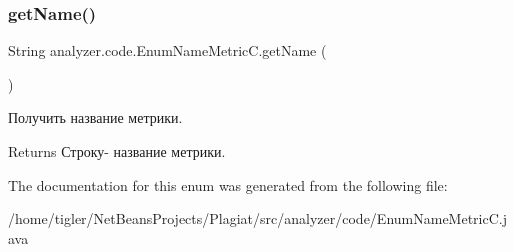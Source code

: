 \subsubsection{\texorpdfstring{get\+Name()}{getName()}}
{\footnotesize\ttfamily String analyzer.\+code.\+Enum\+Name\+Metric\+C.\+get\+Name (\begin{DoxyParamCaption}{ }\end{DoxyParamCaption})\hspace{0.3cm}{\ttfamily [inline]}}

Получить название метрики. \begin{DoxyReturn}{Returns}
Строку-\/ название метрики. 
\end{DoxyReturn}


The documentation for this enum was generated from the following file\+:\begin{DoxyCompactItemize}
\item 
/home/tigler/\+Net\+Beans\+Projects/\+Plagiat/src/analyzer/code/Enum\+Name\+Metric\+C.\+java\end{DoxyCompactItemize}

